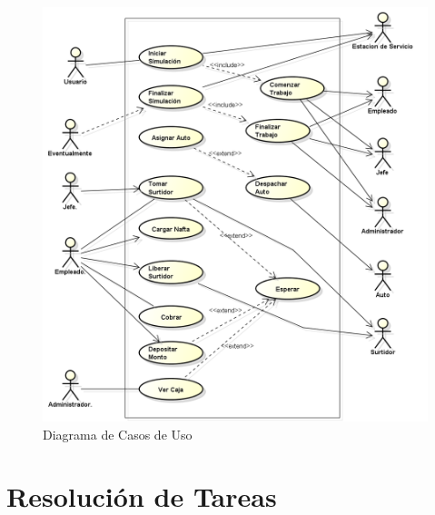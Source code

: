 \documentclass[a4paper,12pt]{article}
\begin{document}
\begin{figure}
\centering
\includegraphics[scale=0.6]{Diagramas/CasosDeUso.png} 
\caption{Diagrama de Casos de Uso}
\label{fig:CasosDeUso}
\end{figure}


\newpage

\section{Resolución de Tareas}
\end{document}
